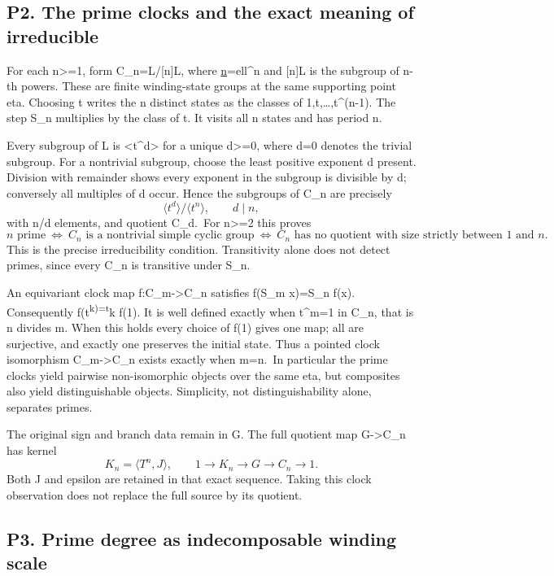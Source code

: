\documentclass[
  11pt,
]{article}
\begin{document}
\subsection{P2. The prime clocks and the exact meaning of
irreducible}\label{p2.-the-prime-clocks-and-the-exact-meaning-of-irreducible}

For each n\textgreater=1, form C\_n=L/{[}n{]}L, where
\href{ell}{n}=ell\^{}n and {[}n{]}L is the subgroup of n-th powers.
These are finite winding-state groups at the same supporting point eta.
Choosing t writes the n distinct states as the classes of
1,t,\ldots,t\^{}(n-1). The step S\_n multiplies by the class of t. It
visits all n states and has period n.

Every subgroup of L is \textless t\^{}d\textgreater{} for a unique
d\textgreater=0, where d=0 denotes the trivial subgroup. For a
nontrivial subgroup, choose the least positive exponent d present.
Division with remainder shows every exponent in the subgroup is
divisible by d; conversely all multiples of d occur. Hence the subgroups
of C\_n are precisely \[
\langle t^d\rangle/\langle t^n\rangle,\qquad d\mid n,
\] with n/d elements, and quotient C\_d.~For n\textgreater=2 this proves
\[
 n\text{ prime}\ \Longleftrightarrow\ C_n\text{ is a nontrivial simple cyclic group}
 \ \Longleftrightarrow\ C_n\text{ has no quotient with size strictly between }1\text{ and }n.
\] This is the precise irreducibility condition. Transitivity alone does
not detect primes, since every C\_n is transitive under S\_n.

An equivariant clock map f:C\_m-\textgreater C\_n satisfies f(S\_m
x)=S\_n f(x). Consequently f(t\textsuperscript{k)=t}k f(1). It is well
defined exactly when t\^{}m=1 in C\_n, that is n divides m. When this
holds every choice of f(1) gives one map; all are surjective, and
exactly one preserves the initial state. Thus a pointed clock
isomorphism C\_m-\textgreater C\_n exists exactly when m=n.~In
particular the prime clocks yield pairwise non-isomorphic objects over
the same eta, but composites also yield distinguishable objects.
Simplicity, not distinguishability alone, separates primes.

The original sign and branch data remain in G. The full quotient map
G-\textgreater C\_n has kernel \[
K_n=\langle T^n,J\rangle,
\qquad 1\to K_n\to G\to C_n\to1.
\] Both J and epsilon are retained in that exact sequence. Taking this
clock observation does not replace the full source by its quotient.

\subsection{P3. Prime degree as indecomposable winding
scale}\label{p3.-prime-degree-as-indecomposable-winding-scale}
\end{document}
